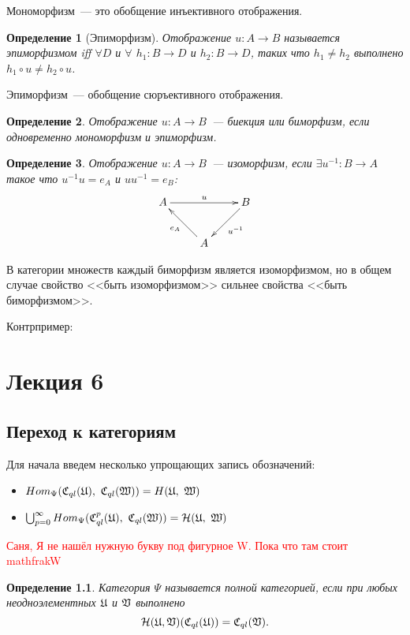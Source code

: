 \documentclass[a4paper, 12pt]{report}
\newtheorem{definition}{Определение}[chapter]
\begin{document}
Мономорфизм~--- это обобщение инъективного отображения.
\begin{definition}[Эпиморфизм]
Отображение $u: A \rightarrow B$ называется эпиморфизмом iff $\forall D$ и $\forall$ $h_1: B \rightarrow D$ и $h_2: B \rightarrow D$, таких что $h_1 \neq h_2$ выполнено $h_1 \circ u \neq h_2 \circ u$.
\end{definition}

Эпиморфизм~--- обобщение сюръективного отображения.

\begin{definition}
Отображение $u: A \rightarrow B$~--- биекция или биморфизм, если одновременно мономорфизм и эпиморфизм.
\end{definition}

\begin{definition}
Отображение $u: A \rightarrow B$~--- изоморфизм, если $\exists u^{-1}: B \rightarrow A$ такое что $u^{-1} u = e_A$ и $u u^{-1} = e_B$:
\begin{equation*}
\xymatrix{
A\ar[rr]^u & & B\ar[ld]^{u^{-1}}\\
 & A\ar[lu]^{e_A} &
}
\end{equation*}
\end{definition}

В категории множеств каждый биморфизм является изоморфизмом, но в общем случае свойство <<быть изоморфизмом>> сильнее свойства <<быть биморфизмом>>.

Контрпример:
\chapter{Лекция 6}
\section{Переход к категориям}
Для начала введем несколько упрощающих запись обозначений:
\begin{itemize}
  \item $Hom_{\Psi}(\Cql(\frakU),\ \Cql(\frakW)) = H(\frakU,\ \frakW)$
  \item $\bigcup_{p=0}^{\infty}Hom_{\Psi}(\Cql^p(\frakU),\ \Cql(\frakW)) = \calH(\frakU,\ \frakW)$
\end{itemize}
\textcolor{red}{Саня, Я не нашёл нужную букву под фигурное W. Пока что там стоит mathfrak{W}}
\begin{definition}
Категория $\Psi$ называется полной категорией, если при любых неодноэлементных $\mathfrak{U}$ и $\mathfrak{V}$ выполнено
\[
\mathcal{H}(\mathfrak{U}, \mathfrak{V})(\mathfrak{C}_{ql}(\mathfrak{U})) = \mathfrak{C}_{ql}(\mathfrak{V}).
\]
\end{definition}
\end{document}
